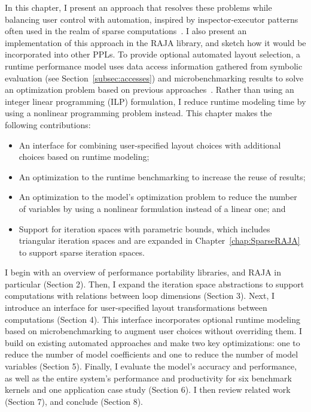 In this chapter, I present an approach that resolves these problems while balancing user control with automation, inspired by inspector-executor patterns often used in the realm of sparse computations~\cite{saltz1990run,saltz1991multiprocessors,Strout14IPDPS,strout2018sparse}.
I also present an implementation of this approach in the RAJA library, and sketch how it would be incorporated into other PPLs.
To provide optional automated layout selection, a runtime performance model uses data access information gathered from symbolic evaluation (see Section~\ref{subsec:accesses}) and microbenchmarking results to solve an optimization problem based on previous approaches~\cite{bixby1994automatic}.
Rather than using an integer linear programming (ILP) formulation, I reduce runtime modeling time by using a nonlinear programming problem instead. 
This chapter makes the following contributions:
\begin{itemize}
\item An interface for combining user-specified layout choices with additional choices based on runtime modeling;
\item An optimization to the runtime benchmarking to increase the reuse of results;
\item An optimization to the model's optimization problem to reduce the number of variables by using a nonlinear formulation instead of a linear one; and 
\item Support for iteration spaces with parametric bounds, which includes triangular iteration spaces and are expanded in Chapter~\ref{chap:SparseRAJA} to support sparse iteration spaces. %
\end{itemize}

I begin with an overview of performance portability libraries, and RAJA in particular (Section 2).
Then, I expand the iteration space abstractions to support computations with relations between loop dimensions (Section 3).
Next, I introduce an interface for user-specified layout transformations between computations (Section 4).
This interface incorporates optional runtime modeling based on microbenchmarking to augment user choices without overriding them.
I build on existing automated approaches and make two key optimizations: one to reduce the number of model coefficients and one to reduce the number of model variables (Section 5).
Finally, I evaluate the model's accuracy and performance, as well as the entire system's performance and productivity for six benchmark kernels and one application case study (Section 6).
I then review related work (Section 7), and conclude (Section 8).


